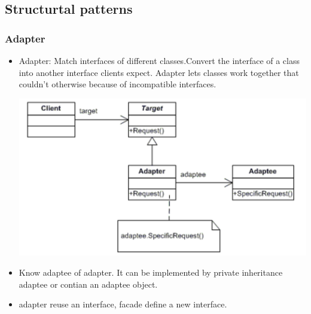 \documentclass[a4paper,12pt,twoside]{book}
\begin{document}
\subsection{Structurtal patterns}
\subsubsection{Adapter}
\begin{itemize}
\item Adapter: Match interfaces of different classes.Convert the interface of a class into another interface clients expect. Adapter lets classes work together that couldn’t otherwise because of incompatible interfaces.

\includegraphics[scale=0.75]{pics/adapter.png}

\item Know adaptee of adapter.  It can be implemented by private inheritance adaptee or contian an adaptee object. 

\item adapter reuse an interface, facade define a new interface. 

\end{itemize}
\end{document}
